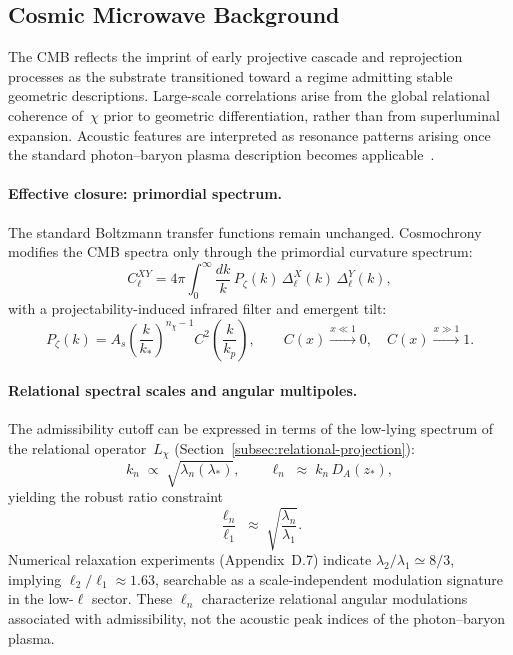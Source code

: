 \subsection{Cosmic Microwave Background}
  \label{subsec:cmb}

  The CMB reflects the imprint of early projective cascade and reprojection
  processes as the substrate transitioned toward a regime admitting stable
  geometric descriptions.
  Large-scale correlations arise from the global relational coherence
  of~$\chi$ prior to geometric differentiation, rather than from
  superluminal expansion.
  Acoustic features are interpreted as resonance patterns arising once the
  standard photon--baryon plasma description becomes
  applicable~\cite{SachsWolfe1967,HuWhite1997,Planck2020}.

  \paragraph{Effective closure: primordial spectrum.}
    The standard Boltzmann transfer functions remain unchanged.
    Cosmochrony modifies the CMB spectra only through the primordial
    curvature spectrum:
    \begin{equation}
      C_\ell^{XY}
      = 4\pi \int_0^\infty \frac{dk}{k}\, P_\zeta(k)\,
      \Delta_\ell^{X}(k)\,\Delta_\ell^{Y}(k),
    \end{equation}
    with a projectability-induced infrared filter and emergent tilt:
    \begin{equation}
      P_\zeta(k)
      = A_s\left(\frac{k}{k_*}\right)^{n_\chi-1}
      C^2\!\left(\frac{k}{k_p}\right),
      \qquad
      C(x)\xrightarrow{x\ll 1}0,\quad
      C(x)\xrightarrow{x\gg 1}1.
    \end{equation}

  \paragraph{Relational spectral scales and angular multipoles.}
    The admissibility cutoff can be expressed in terms of the low-lying
    spectrum of the relational operator~$L_\chi$
    (Section~\ref{subsec:relational-projection}):
    \begin{equation}
      k_n \;\propto\; \sqrt{\lambda_n(\lambda_*)},
      \qquad
      \ell_n \;\approx\; k_n\,D_A(z_*),
    \end{equation}
    yielding the robust ratio constraint
    \begin{equation}
      \frac{\ell_n}{\ell_1}
      \;\approx\;
      \sqrt{\frac{\lambda_n}{\lambda_1}}.
      \label{eq:ell_ratio_spectral}
    \end{equation}
    Numerical relaxation experiments (Appendix~D.7) indicate
    $\lambda_2/\lambda_1 \simeq 8/3$, implying
    $\ell_2/\ell_1 \approx 1.63$, searchable as a scale-independent
    modulation signature in the low-$\ell$ sector.
    These $\ell_n$ characterize relational angular modulations associated
    with admissibility, not the acoustic peak indices of the photon--baryon
    plasma.
